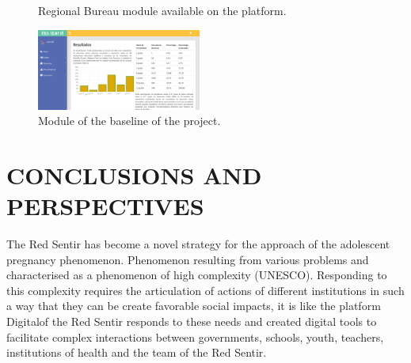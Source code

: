 \documentclass[journal,transmag]{IEEEtran}
\begin{document}
\begin{figure}[tbp]
  \centering
	  \hspace{1mm}
  \caption{Regional Bureau module available on the platform. }
  \label{fig:mesa}
\end{figure}

\begin{figure}[tbp]
\centering
\includegraphics[width=0.48\textwidth]{resultados.png}
\caption{Module of the baseline of the project.}
\label{fig:lineabase}
\end{figure}

\section{CONCLUSIONS AND PERSPECTIVES}\label{sec:conclusiones}
The Red Sentir has become a novel strategy for the approach of the adolescent pregnancy phenomenon. Phenomenon resulting from various problems and characterised as a phenomenon of high complexity (UNESCO). Responding to this complexity requires the articulation of actions of different institutions in such a way that they can be create favorable social impacts, it is like the platform Digitalof the Red Sentir responds to these needs and created digital tools to facilitate complex interactions between governments, schools, youth, teachers, institutions of health and the team of the Red Sentir.
\end{document}
